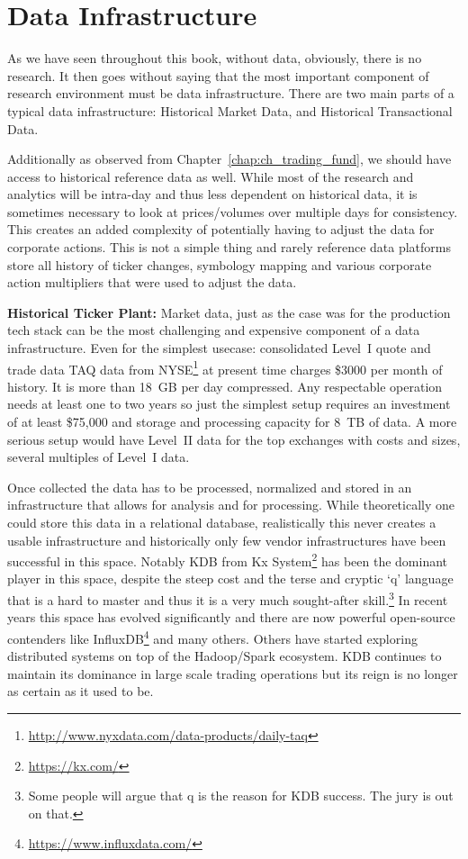\section{Data Infrastructure\label{sec:tech_data_infra}}\label{in:dat_infr1}

As we have seen throughout this book, without data, obviously, there is no research. It then goes without saying that the most important component of research environment must be data infrastructure. There are two main parts of a typical data infrastructure: Historical Market Data, and Historical Transactional Data. 


Additionally as observed from Chapter~\ref{chap:ch_trading_fund}, we should have access to historical reference data as well. While most of the research and analytics will be intra-day and thus less dependent on historical data, it is sometimes necessary to look at prices/volumes over multiple days for consistency. This creates an added complexity of potentially having to adjust the data for corporate actions. This is not a simple thing and rarely reference data platforms store all history of ticker changes, symbology mapping and various corporate action multipliers that were used to adjust the data. \twomedskip


\noindent\textbf{Historical Ticker Plant:}\label{in:hist_tick_plant} Market data, just as the case was for the production tech stack can be the most challenging and expensive component of a data infrastructure. Even for  the simplest usecase: consolidated Level~I quote and trade data TAQ data\label{in:taq3} from NYSE\footnote{\url{http://www.nyxdata.com/data-products/daily-taq}} at present time charges \$3000 per month of history. It is more than 18~GB per day compressed. Any respectable operation needs at least one to two years so just the simplest setup requires an investment of at least \$75,000 and storage and processing capacity for 8~TB of data. A more serious setup would have Level~II data for the top exchanges with costs and sizes, several multiples of Level~I data. \label{in:level2dat2}


Once collected the data has to be processed, normalized and stored in an infrastructure that allows for analysis and for processing. While theoretically one could store this data in a relational database, realistically this never creates a usable infrastructure and historically only few vendor infrastructures have been successful in this space. Notably KDB from Kx System\footnote{\url{https://kx.com/}} has been the dominant player in this space, despite the steep cost and the terse and cryptic `q' language that is a hard to master and thus it is a very much sought-after skill.\footnote{Some people will argue that q is the reason for KDB success. The jury is out on that.} In recent years this space has evolved significantly and there are now powerful open-source contenders like InfluxDB\footnote{\url{https://www.influxdata.com/}} and many others. Others have started exploring distributed systems on top of the Hadoop/Spark ecosystem. KDB continues to maintain its dominance in large scale trading operations but its reign is no longer as certain as it used to be.


